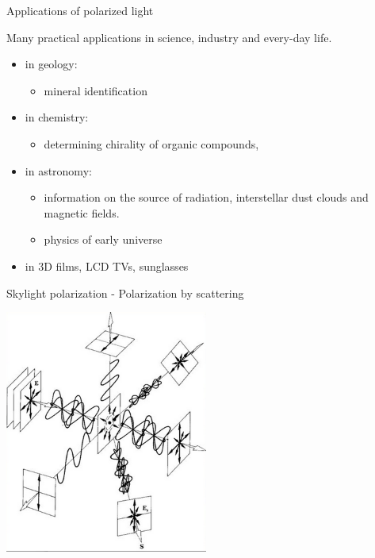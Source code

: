 
%
%
%

\begin{frame}{Applications of polarized light}

Many practical applications in science, industry and every-day life.

\begin{itemize}
  \item in geology:
     \begin{itemize}
           \item mineral identification
     \end{itemize}
  \item in chemistry:
     \begin{itemize}
           \item determining chirality of organic compounds,
     \end{itemize}
  \item in astronomy:
     \begin{itemize}
            \item information on the source of radiation, interstellar dust clouds and magnetic fields.
            \item physics of early universe
     \end{itemize}
  \item in 3D films, LCD TVs, sunglasses

\end{itemize}

\end{frame}


%
%
%

\begin{frame}{Skylight polarization - Polarization by scattering}

\begin{center}
   \includegraphics[width=0.50\textwidth]{./images/schematics/skylight_polarization_scattering.png}\\
\end{center}

\end{frame}

